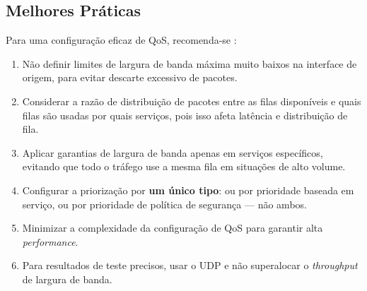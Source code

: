 \subsection{Melhores Práticas}

Para uma configuração eficaz de QoS, recomenda-se \cite{fortinet2024}:

\begin{enumerate}
  \item Não definir limites de largura de banda máxima muito baixos na interface
  de origem, para evitar descarte excessivo de pacotes.
  \item Considerar a razão de distribuição de pacotes entre as filas disponíveis e
  quais filas são usadas por quais serviços, pois isso afeta latência e
  distribuição de fila.
  \item Aplicar garantias de largura de banda apenas em serviços específicos,
  evitando que todo o tráfego use a mesma fila em situações de alto volume.
  \item Configurar a priorização por \textbf{um único tipo}: ou por prioridade
  baseada em serviço, ou por prioridade de política de segurança — não ambos.
  \item Minimizar a complexidade da configuração de QoS para garantir alta
  \textit{performance}.
  \item Para resultados de teste precisos, usar o UDP e não superalocar o
  \textit{throughput} de largura de banda.
\end{enumerate}
